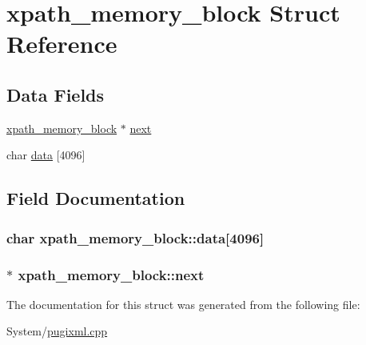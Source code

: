 \hypertarget{structxpath__memory__block}{\section{xpath\-\_\-memory\-\_\-block Struct Reference}
\label{structxpath__memory__block}
}
\subsection*{Data Fields}
\begin{DoxyCompactItemize}
\item 
\hyperlink{structxpath__memory__block}{xpath\-\_\-memory\-\_\-block} $\ast$ \hyperlink{structxpath__memory__block_ab7f0d8400b40a51cdb063e76fd19a93c}{next}
\item 
char \hyperlink{structxpath__memory__block_a7b00376d0eac172ab537b6b0964858a9}{data} \mbox{[}4096\mbox{]}
\end{DoxyCompactItemize}


\subsection{Field Documentation}
\hypertarget{structxpath__memory__block_a7b00376d0eac172ab537b6b0964858a9}{
\subsubsection[{data}]{\setlength{\rightskip}{0pt plus 5cm}char xpath\-\_\-memory\-\_\-block\-::data\mbox{[}4096\mbox{]}}}\label{structxpath__memory__block_a7b00376d0eac172ab537b6b0964858a9}
\hypertarget{structxpath__memory__block_ab7f0d8400b40a51cdb063e76fd19a93c}{
\subsubsection[{next}]{$\ast$ xpath\-\_\-memory\-\_\-block\-::next}}\label{structxpath__memory__block_ab7f0d8400b40a51cdb063e76fd19a93c}


The documentation for this struct was generated from the following file\-:\begin{DoxyCompactItemize}
\item 
System/\hyperlink{pugixml_8cpp}{pugixml.\-cpp}\end{DoxyCompactItemize}
